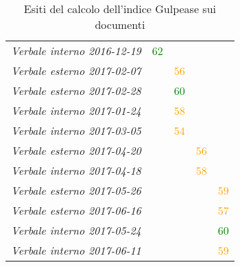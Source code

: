 \documentclass[PdQ.tex]{subfiles}
\begin{document}
\begin{table}[H]
\begin{tabular}{l c c c c}
					\rule[0cm]{0cm}{0.4cm}
					\textit{Verbale interno 2016-12-19} & \textcolor{green}{62} & & &\\
					\rule[0cm]{0cm}{0.4cm}
					\textit{Verbale esterno 2017-02-07} & & \textcolor{orange}{56} & & \\
					\rule[0cm]{0cm}{0.4cm}
					\textit{Verbale esterno 2017-02-28} & & \textcolor{green}{60} & &\\
					\rule[0cm]{0cm}{0.4cm}
					\textit{Verbale interno 2017-01-24} & & \textcolor{orange}{58} & &\\
					\rule[0cm]{0cm}{0.4cm}
					\textit{Verbale interno 2017-03-05} & & \textcolor{orange}{54} & &\\
					\rule[0cm]{0cm}{0.4cm}
					\textit{Verbale esterno 2017-04-20} & & & \textcolor{orange}{56} & \\
					\rule[0cm]{0cm}{0.4cm}
					\textit{Verbale interno 2017-04-18} & & & \textcolor{orange}{58} & \\
					\rule[0cm]{0cm}{0.4cm}
					\textit{Verbale esterno 2017-05-26} & & & & \textcolor{orange}{59}\\
					\rule[0cm]{0cm}{0.4cm}
					\textit{Verbale esterno 2017-06-16} & & & & \textcolor{orange}{57}\\
					\rule[0cm]{0cm}{0.4cm}
					\textit{Verbale interno 2017-05-24} & & & & \textcolor{green}{60}\\
					\rule[0cm]{0cm}{0.4cm}
					\textit{Verbale interno 2017-06-11} & & & & \textcolor{orange}{59}\\
					\hline
				\end{tabular}
				\caption{Esiti del calcolo dell'indice Gulpease sui documenti}
			\end{table}
\end{document}
